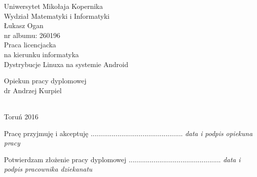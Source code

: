 \usepackage{graphicx}
\usepackage{makeidx}
\usepackage{alltt}
\usepackage{listings}
\usepackage{polski}
\usepackage{graphicx} 
\usepackage[colorlinks]{hyperref}
\usepackage{tocloft}


\makeindex


	
	


 
\begin{titlepage}
	\begin{center}
		{\large Uniwersytet Mikołaja Kopernika\\} {\large Wydział Matematyki i Informatyki\\}  \vspace{2.1cm} {\large Łukasz Ogan\\}
		nr albumu: 260196\\
		\vspace{2cm}
		Praca licencjacka\\
		na kierunku informatyka\\
		\vspace{2cm} {\huge Dystrybucje Linuxa na systemie Android\\}
	\end{center}
	\hfill
	\begin{minipage}{8cm}
		\vspace{12mm}
		{Opiekun pracy dyplomowej\\
			dr Andrzej Kurpiel\\
			\\}
	\end{minipage}
	\vspace{2cm}
	\begin{center}
		{Toruń 2016\\}
	\end{center}
	\vspace{1.2cm}
	\begin{minipage}{8cm}
		\begin{center}
			Pracę przyjmuję i akceptuję \vspace{7mm}
			\newline
			................................................\newline
			\small\emph{data i podpis opiekuna pracy}\newline
		\end{center}
	\end{minipage}
	\begin{minipage}{8cm}
		\begin{center}
			Potwierdzam złożenie pracy dyplomowej \vspace{7mm}
			\newline
			................................................\newline
			\small\emph{data i podpis pracownika dziekanatu}\newline
		\end{center}
	\end{minipage}
\end{titlepage}	 

